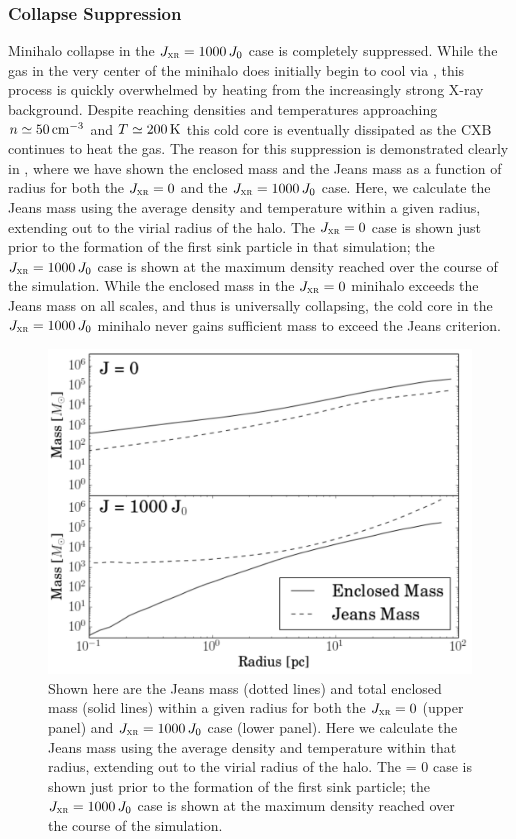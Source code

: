 \documentclass[../thesis.tex]{subfiles}
\begin{document}
\subsubsection{Collapse Suppression}
 \label{suppression}
Minihalo collapse in the $\jxr = 1000\,J_0$ case is completely suppressed.  While the gas in the very center of the minihalo does initially begin to cool via \htwo, this process is quickly overwhelmed by heating from the increasingly strong X-ray background.  Despite reaching densities and temperatures approaching $n \simeq 50\cc$ and $T \simeq 200\kelvin$ this cold core is eventually dissipated as the CXB continues to heat the gas. 
The reason for this suppression is demonstrated clearly in , where we have shown the enclosed mass and the Jeans mass as a function of radius for both the $\jxr = 0$ and the $\jxr = 1000\,J_0$ case. Here, we calculate the Jeans mass using the average density and temperature within a given radius, extending out to the virial radius of the halo.  The $\jxr = 0$ case is shown just prior to the formation of the first sink particle in that simulation; the $\jxr = 1000\,J_0$ case is shown at the maximum density reached over the course of the simulation.  While the enclosed mass in the $\jxr = 0$ minihalo exceeds the Jeans mass on all scales, and thus is universally collapsing, the cold core in the $\jxr = 1000\,J_0$ minihalo never gains sufficient mass to exceed the Jeans criterion.
\begin{figure}
  \begin{center}
    \includegraphics[width=\columnwidth]{figures/halo/blowout}   
    \caption{Shown
      here are the Jeans mass (dotted lines) and total enclosed mass
      (solid lines) within a given radius for  both the $\jxr = 0$ (upper panel) and $\jxr = 1000\,J_0$ case (lower panel). Here we calculate the Jeans mass using the average density and temperature within that radius, extending out to the virial radius of the halo.  The \jxr = 0 case is shown just prior to the formation of the first sink particle; the $\jxr = 1000\,J_0$ case is shown at the maximum density reached over the course of the simulation.}
    \label{suppressed}
  \end{center}
\end{figure}
\end{document}
